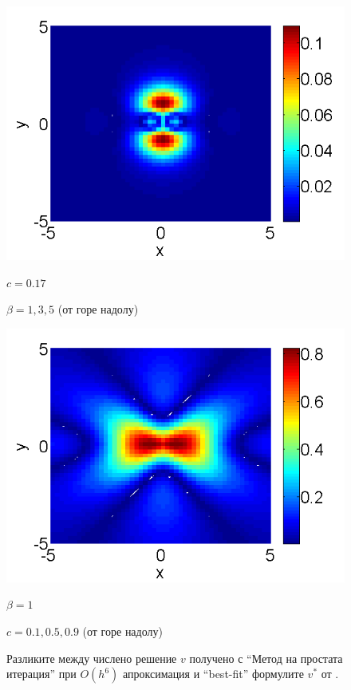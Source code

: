 \documentclass{article}
\theoremstyle{remark}
\begin{document}
\begin{figure}[htbp]
\begin{minipage}[b]{0.48\linewidth}
		 \includegraphics[width=\linewidth]{BestFitVsSimpleIter/ChristovIC_50_bt5_c017_h02_O(h^6).png}
		\centerline{$c=0.17$}
		\centerline{$\beta = 1,3,5$ (от горе надолу) }
	\end{minipage}
	\begin{minipage}[b]{0.48\linewidth}
		\raggedright
		 \includegraphics[width=\linewidth]{BestFitVsSimpleIter/ChristovIC_50_bt1_c090_h02_O(h^6).png}
		\centerline{$\beta = 1$}
		\centerline{$c = 0.1, 0.5, 0.9$ (от горе надолу)}
	\end{minipage}
	\caption{Разликите между числено решение $v$ получено с ``Метод на простата итерация'' при $O(h^6)$ апроксимация и ``best-fit'' формулите $v^*$ от \cite{Ch2011}. }
	\label{fig:difference}
\end{figure}
\end{document}
